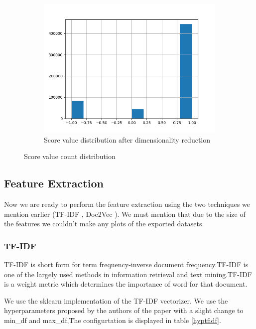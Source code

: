 \documentclass{article}
\begin{document}
\begin{figure}[h!]
  \begin{subfigure}[b]{0.4\linewidth}
    \includegraphics[width=\linewidth]{Score3.png}
    \caption{Score value distribution after dimensionality reduction}
    \label{fig:Score3}
  \end{subfigure}
  \caption{Score value count distribution}
\end{figure}

\subsection{Feature Extraction}
Now we are ready to perform the feature extraction using the two techniques 
we mention earlier (TF-IDF \cite{tfidf}, Doc2Vec \cite{doc2vec}). 
We must mention that due to the size of the features we couldn't make any plots
of the exported datasets.

\subsubsection{TF-IDF}
TF-IDF \cite{tfidf} is short form for term frequency-inverse document frequency.TF-IDF is
one of the largely used methods in information retrieval and text mining.TF-IDF is
a weight metric which determines the importance of word for that document.

We use the sklearn \cite{scikit-learn} implementation of the TF-IDF vectorizer.
We use the hyperparameters proposed by the authors of the paper \cite{studyPaper} with a slight
change to min\_df and max\_df,\. The configurtation is
displayed in table \ref{hyptfidf}.
\end{document}
